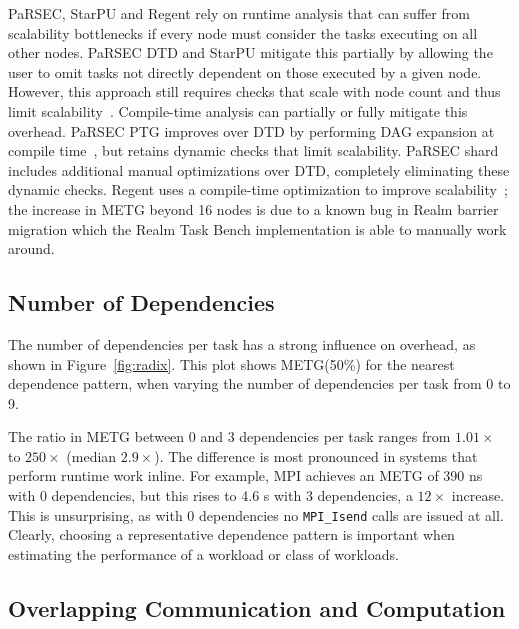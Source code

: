 PaRSEC, StarPU and Regent
rely on runtime analysis that can suffer from
scalability bottlenecks if every node must consider the tasks
executing on all other nodes. PaRSEC DTD and StarPU mitigate this
partially by allowing the user to omit tasks not directly
dependent on those executed by a given node. However, this approach still requires checks that scale with
node count and thus limit scalability~\cite{PARSEC_DTD}. Compile-time analysis can
partially or fully mitigate this overhead. PaRSEC PTG improves over DTD 
by performing DAG expansion at compile time~\cite{PARSEC_DTD}, but
retains dynamic checks that limit scalability. PaRSEC shard includes additional manual optimizations over DTD, completely eliminating these dynamic checks. Regent
uses a compile-time optimization to improve
scalability~\cite{ControlReplication17}; the increase in METG beyond 16 nodes is due to a known bug in Realm barrier migration which the Realm Task Bench implementation is able to manually work around.

\subsection{Number of Dependencies}
\label{subsec:number-of-dependencies}

The number of dependencies per task has a strong influence on
overhead, as shown in
Figure~\ref{fig:radix}. This plot shows METG(50\%) for the nearest
dependence pattern, when varying the number of dependencies per task
from 0 to 9.



The ratio in METG between 0 and 3 dependencies per task ranges from
$1.01\times$ to $250\times$ (median $2.9\times$). The difference is most pronounced in systems that
perform runtime work inline. For example, MPI achieves an METG of 390
ns with 0 dependencies, but this rises to 4.6 \textmu{}s with 3 dependencies,
a $12\times$ increase. This is unsurprising, as with
0 dependencies no \lstinline[language=C++]{MPI_Isend} calls are
issued at all. Clearly, choosing a representative dependence
pattern is important when estimating the performance of a workload or
class of workloads.



\subsection{Overlapping Communication and Computation}

